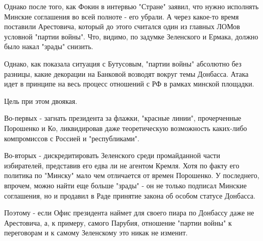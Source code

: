 Однако после того, как Фокин в интервью "Стране" заявил, что нужно
исполнять Минские соглашения во всей полноте - его убрали. А через
какое-то время поставили Арестовича, который до этого считался один из
главных ЛОМов условной "партии войны". Что, видимо, по задумке Зеленского
и Ермака, должно было накал "зрады" снизить. 

Однако, как показала ситуация с Бутусовым, "партии войны" абсолютно без
разницы, какие декорации на Банковой возводят вокруг темы Донбасса. Атака
идет в принципе на весь процесс отношений с РФ в рамках минской площадки.

Цель при этом двоякая.

Во-первых - загнать президента за флажки, "красные линии", прочерченные
Порошенко и Ко, ликвидировав даже теоретическую возможность каких-либо
компромиссов с Россией и "республиками". 

Во-вторых - дискредитировать Зеленского среди промайданной части
избирателей, представив его едва ли не агентом Кремля. Хотя по факту его
политика по "Минску" мало чем отличается от времен Порошенко. У
последнего, впрочем, можно найти еще больше "зрады" - он не только
подписал Минские соглашения, но и продавил в Раде принятие закона об
особом статусе Донбасса. 

Поэтому - если Офис президента наймет для своего пиара по Донбассу даже не
Арестовича, а, к примеру, самого Парубия, отношение "партии войны" к
переговорам и к самому Зеленскому это никак не изменит.
